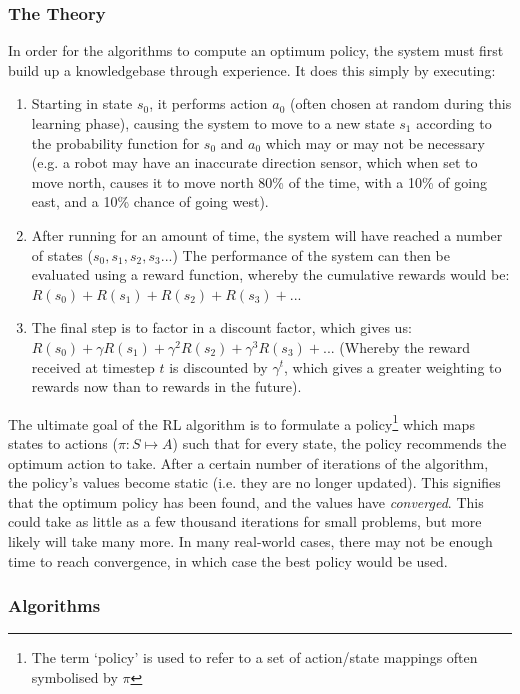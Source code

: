 \documentclass[a4paper,oneside]{report}
\begin{document}
\subsubsection{The Theory} 

In order for the algorithms to compute an optimum policy, the system must first build up a knowledgebase through experience. It does this simply by executing:

\begin{enumerate}
	\item Starting in state $s_0$, it performs action $a_0$ (often chosen at random during this learning phase), causing the system to move to a new state $s_1$ according to the probability function for $s_0$ and $a_0$ which may or may not be necessary (e.g. a robot may have an inaccurate direction sensor, which when set to move north, causes it to move north 80\% of the time, with a 10\% of going east, and a 10\% chance of going west).
	\item After running for an amount of time, the system will have reached a number of states ($s_0, s_1, s_2, s_3 ...$) The performance of the system can then be evaluated using a reward function, whereby the cumulative rewards would be: $R(s_0) + R(s_1) + R(s_2) + R(s_3) + ...$
	\item The final step is to factor in a discount factor, which gives us: $R(s_0) + \gamma R(s_1) + \gamma^2 R(s_2) + \gamma^3 R(s_3) + ...$ (Whereby the reward received at timestep $t$ is discounted by $\gamma^t$, which gives a greater weighting to rewards now than to rewards in the future).
\end{enumerate}

The ultimate goal of the RL algorithm is to formulate a policy\footnote{The term `policy' is used to refer to a set of action/state mappings often symbolised by $\pi$} which maps states to actions ($\pi: S \mapsto A$) such that for every state, the policy recommends the optimum action to take. After a certain number of iterations of the algorithm, the policy's values become static (i.e. they are no longer updated). This signifies that the optimum policy has been found, and the values have \emph{converged}. This could take as little as a few thousand iterations for small problems, but more likely will take many more. In many real-world cases, there may not be enough time to reach convergence, in which case the best policy would be used.

\subsubsection{Algorithms}
\end{document}
